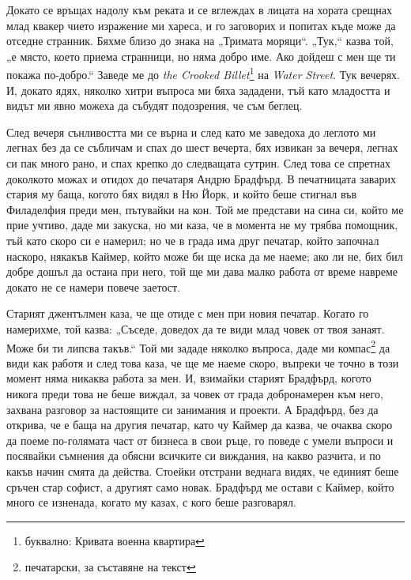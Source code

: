 \documentclass[12pt]{book}
\begin{document}
Докато се връщах надолу към реката и се вглеждах в лицата на хората срещнах млад квакер чието изражение ми хареса, и го заговорих и попитах къде може да отседне странник. Бяхме близо до знака на „Тримата моряци“. „Тук,“ казва той, „е място, което приема странници, но няма добро име. Ако дойдеш с мен ще ти покажа по-добро.“ Заведе ме до \textit{the Crooked Billet}\footnote{буквално: Кривата военна квартира} на \textit{Water Street}. Тук вечерях. И, докато ядях, няколко хитри въпроса ми бяха зададени, тъй като младостта и видът ми явно можеха да събудят подозрения, че съм беглец.

След вечеря сънливостта ми се върна и след като ме заведоха до леглото ми легнах без да се събличам и спах до шест вечерта, бях извикан за вечеря, легнах си пак много рано, и спах крепко до следващата сутрин. След това се спретнах доколкото можах и отидох до печатаря Андрю Брадфърд. В печатницата заварих стария му баща, когото бях видял в Ню Йорк, и който беше стигнал във Филаделфия преди мен, пътувайки на кон. Той ме представи на сина си, който ме прие учтиво, даде ми закуска, но ми каза, че в момента не му трябва помощник, тъй като скоро си е намерил; но че в града има друг печатар, който започнал наскоро, някакъв Каймер, който може би ще иска да ме наеме; ако ли не, бих бил добре дошъл да остана при него,  той ще ми дава малко работа от време навреме докато не се намери повече заетост.

Старият джентълмен каза, че ще отиде с мен при новия печатар. Когато го намерихме, той казва: „Съседе, доведох да те види млад човек от твоя занаят. Може би ти липсва такъв.“ Той ми зададе няколко въпроса, даде ми компас\footnote{печатарски, за съставяне на текст} да види как работя и след това каза, че ще ме наеме скоро, въпреки че точно в този момент няма никаква работа за мен. И, взимайки старият Брадфърд, когото никога преди това не беше виждал, за човек от града добронамерен към него, захвана разговор за настоящите си занимания и проекти. А Брадфърд, без да открива, че е баща на другия печатар, като чу Каймер да казва, че очаква скоро да поеме по-голямата част от бизнеса в свои ръце, го поведе с умели въпроси и посявайки съмнения да обясни всичките си виждания, на какво разчита, и по какъв начин смята да действа. Стоейки отстрани веднага видях, че единият беше сръчен стар софист, а другият само новак. Брадфърд ме остави с Каймер, който много се изненада, когато му казах, с кого беше разговарял.
\end{document}
